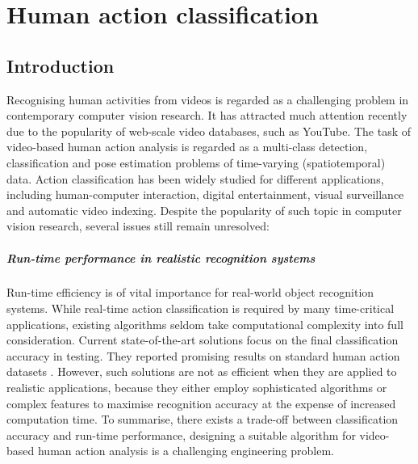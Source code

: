 \chapter{Human action classification}
\label{chap/act}

\section{Introduction}
\label{sec/act/intro}

Recognising human activities from videos is regarded as a challenging problem in contemporary computer vision research. It has attracted much attention recently due to the popularity of web-scale video databases, such as YouTube. The task of video-based human action analysis is regarded as a multi-class detection, classification and pose estimation problems of time-varying (spatiotemporal) data.  Action classification has been widely studied for different applications, including human-computer interaction, digital entertainment, visual surveillance and automatic video indexing. Despite the popularity of such topic in computer vision research, several issues still remain unresolved:   

\paragraph{Run-time performance in realistic recognition systems} Run-time efficiency is of vital importance for real-world object recognition systems. While real-time action classification is required by many time-critical applications, existing algorithms seldom take computational complexity into full consideration. Current state-of-the-art solutions focus on the final classification accuracy in testing. They reported promising results on standard human action datasets \cite{Kim2007, Lin2009, Liu2008, Willems2009}. However, such solutions are not as efficient when they are applied to realistic applications, because they either employ sophisticated algorithms or complex features to maximise recognition accuracy at the expense of increased computation time. To summarise, there exists a trade-off between classification accuracy and run-time performance, designing a suitable algorithm for video-based human action analysis is a challenging engineering problem.  

